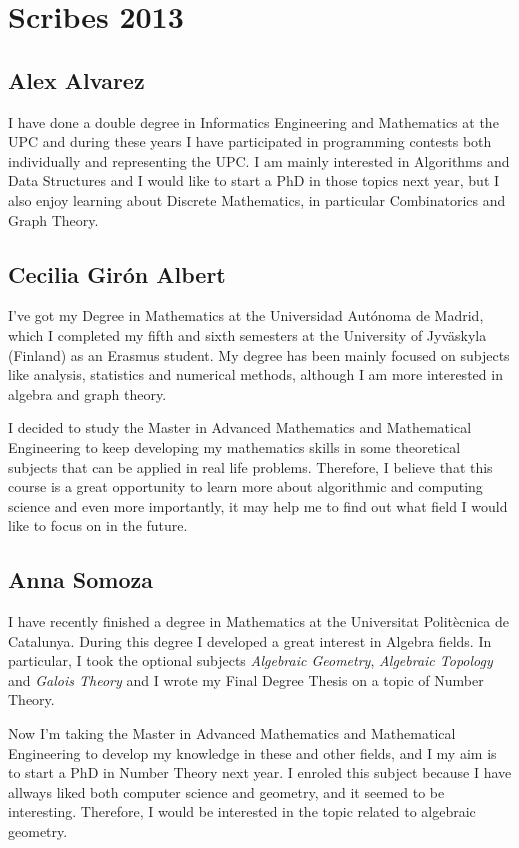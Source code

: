 \chapter*{Scribes 2013}

\section{Alex Alvarez}
I have done a double degree in Informatics Engineering and Mathematics at the UPC and during these years I have participated in programming contests both individually and representing the UPC. I am mainly interested in Algorithms and Data Structures and I would like to start a PhD in those topics next year, but I also enjoy learning about Discrete Mathematics, in particular Combinatorics and Graph Theory.


\section{Cecilia Girón Albert}

I've got my Degree in Mathematics at the Universidad Autónoma de Madrid, which I completed my fifth and sixth semesters 
at the University of Jyväskyla (Finland) as an Erasmus student. My degree has been mainly focused on subjects like 
analysis, statistics and numerical methods, although I am more interested in algebra and graph theory. 

I decided to study the Master in Advanced Mathematics and Mathematical Engineering to keep developing my mathematics skills 
in some theoretical subjects that can be applied in real life problems. Therefore, I believe that this course is a great 
opportunity to learn more about algorithmic and computing science and even more importantly, it may help me to find out 
what field I would like to focus on in the future.

\section{Anna Somoza}

I have recently finished a degree in Mathematics at the Universitat Politècnica de Catalunya. During this degree I developed a great interest in Algebra fields. In particular, I took the optional subjects \emph{Algebraic Geometry}, \emph{Algebraic Topology} and \emph{Galois Theory} and I wrote my Final Degree Thesis on a topic of Number Theory.

Now I'm taking the Master in Advanced Mathematics and Mathematical Engineering to develop my knowledge in these and other fields, and I my aim is to start a PhD in Number Theory next year. I enroled this subject because I have allways liked both computer science and geometry, and it seemed to be interesting. Therefore, I would be interested in the topic related to algebraic geometry.

